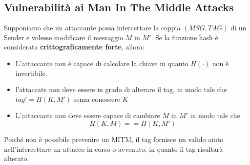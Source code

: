 \subsection{Vulnerabilità ai Man In The Middle Attacks}
Supponiamo che un attaccante possa intercettare la coppia $(MSG,TAG)$ di un Sender e volesse modificare il messaggio $M$ in $M'$. Se la funzione hash è considerata \textbf{crittograficamente forte}, allora:
\begin{itemize}
    \item L'attaccante non è capace di calcolare la chiave in quanto $H(\cdot)$ non è invertibile.
    \item l'attaccate non deve essere in grado di alterare il tag, in modo tale che $tag'=H(K,M')$ senza conoscere $K$
    \item L'attaccante non deve essere capace di cambiare $M$ in $M'$ in modo tale che \[H(K,M)==H(K,M')\]
\end{itemize}
Poiché non è possibile prevenire un MITM, il tag fornisce un valido aiuto nell'intercettare un attacco in corso o avvenuto, in quanto il tag risultarà alterato.
